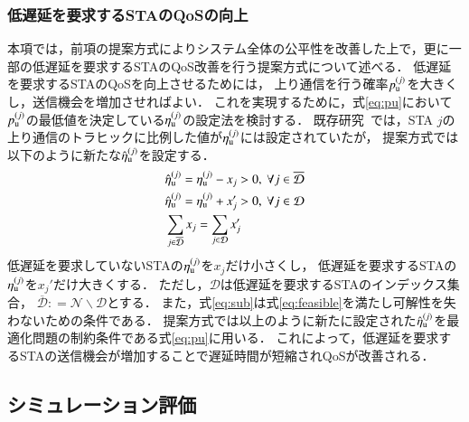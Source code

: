 \documentclass[technicalreport]{ieicej}
\newcommand{\etau}{\eta_{\rm u}^{(j)}}
\def\equiv{\mathrel{\mathop:}=}
\begin{document}
		\subsubsection{低遅延を要求するSTAのQoSの向上}\label{sec:qos}
			本項では，前項の提案方式によりシステム全体の公平性を改善した上で，更に一部の低遅延を要求するSTAのQoS改善を行う提案方式について述べる．
			低遅延を要求するSTAのQoSを向上させるためには，
			上り通信を行う確率$p_{\rm u}^{(j)}$を大きくし，送信機会を増加させればよい．
			これを実現するために，式\eqref{eq:pu}において$p_{\rm u}^{(j)}$の最低値を決定している$\etau$の設定法を検討する．
			既存研究~\cite{promac}では，STA $j$の上り通信のトラヒックに比例した値が$\etau$には設定されていたが，
			提案方式では以下のように新たな${\hat \eta}_{\rm u}^{(j)}$を設定する．
			\begin{align}
				&{\hat \eta}_{\rm u}^{(j)} = \etau -x_j>0,\ \forall j \in {\overline {\mathcal D}} \label{eq:new_etau_dbar}\\
				&{\hat \eta}_{\rm u}^{(j)} = \etau + x_j'>0,\ \forall j \in {\mathcal D} \label{eq:new_etau_d}\\
				&\sum_{j\in{\overline {\mathcal D}}} x_j = \sum_{j\in{\mathcal D}} x_j' \label{eq:sub}
			\end{align}
			低遅延を要求していないSTAの$\etau$を$x_j$だけ小さくし，
			低遅延を要求するSTAの$\etau$を$x_j'$だけ大きくする．
			ただし，$\mathcal D$は低遅延を要求するSTAのインデックス集合，
			${\overline {\mathcal D}}\equiv{\mathcal N}\backslash{\mathcal D}$とする．
			また，式\eqref{eq:sub}は式\eqref{eq:feasible}を満たし可解性を失わないための条件である．
			提案方式では以上のように新たに設定された${\hat \eta}_{\rm u}^{(j)}$を最適化問題の制約条件である式\eqref{eq:pu}に用いる．
			これによって，低遅延を要求するSTAの送信機会が増加することで遅延時間が短縮されQoSが改善される．

	\subsection{シミュレーション評価}
\end{document}

